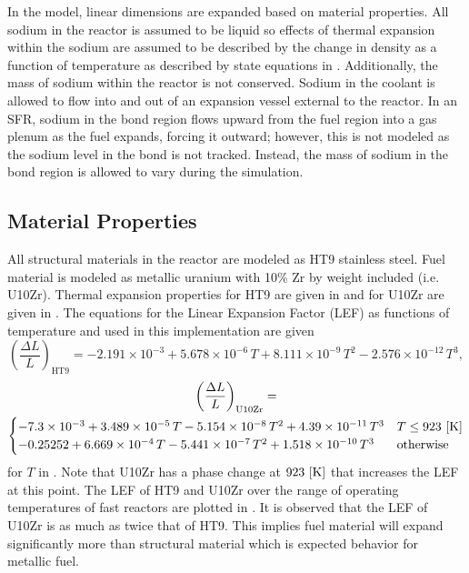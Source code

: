   In the model, linear dimensions are expanded based on material properties.
  All sodium in the reactor is assumed to be liquid so effects of thermal
  expansion within the sodium are assumed to be described by the change in
  density as a function of temperature as described by state equations in
  \cite{sodiumProp}. Additionally, the mass of sodium within the reactor is not
  conserved. Sodium in the coolant is allowed to flow into and out of an
  expansion vessel external to the reactor. In an SFR, sodium in the bond region
  flows upward from the fuel region into a gas plenum as the fuel expands,
  forcing it outward; however, this is not modeled as the sodium level in the 
  bond is not tracked. Instead, the mass of sodium in the bond region is allowed
  to vary during the simulation.

  \subsection{Material Properties}
    \label{sec:model_details__material_properties}
    All structural materials in the reactor are modeled as HT9 stainless steel.
    Fuel material is modeled as metallic uranium with 10\% Zr by weight included
    (i.e. U10Zr). Thermal expansion properties for HT9 are given in 
    \cite{ht9Prop} and for U10Zr are given in \cite{thexpU10Zr}. The equations 
    for the Linear Expansion Factor (LEF) as functions of temperature and used 
    in this implementation are given
    \begin{equation}
      \label{eq:lef_ht9}
      \left( \frac{\Delta L}{L} \right)_{\text{HT9}} = 
        -2.191 \times 10^{-3} + 5.678 \times 10^{-6} \, T + 
        8.111 \times 10^{-9} \, T^2 - 2.576 \times 10^{-12} \, T^3 ,
    \end{equation}
    \begin{multline}
      \label{eq:lef_u10zr}
      \left( \frac{\Delta L}{L} \right)_{\text{U10Zr}} = \\
        \begin{cases}
          -7.3 \times 10^{-3} + 3.489 \times 10^{-5} \, T 
            - 5.154 \times 10^{-8} \, T^2 + 4.39 \times 10^{-11} \, T^3 & 
            T \le 923 \,\left[\text{{K}}\right] \\
          -0.25252 + 6.669 \times 10^{-4} \, T - 5.441 \times 10^{-7} \, T^2 
            + 1.518 \times 10^{-10} \, T^3 & \text{otherwise}
        \end{cases}
    \end{multline}
    for $T$ in . Note that U10Zr has a phase change at $923 \,\left[\text{{K}}\right]$
    that increases the LEF at this point. The LEF of HT9 and U10Zr over the 
    range of operating temperatures of fast reactors are plotted in 
    . It is observed that the LEF of U10Zr is as much as 
    twice that of HT9. This implies fuel material will expand significantly more 
    than structural material which is expected behavior for metallic fuel.


